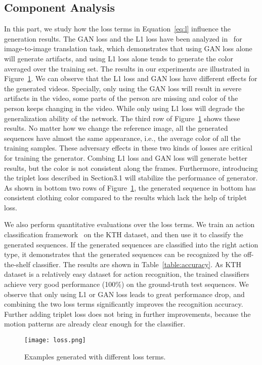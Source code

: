 \documentclass[journal]{IEEEtran}
\begin{document}
\subsection{Component Analysis}
In this part, we study how the loss terms in Equation~\ref{eq:l} influence the generation results. The GAN loss and the L1 loss have been analyzed in~\cite{DBLP:journals/corr/IsolaZZE16} for image-to-image translation task, which demonstrates that using GAN loss alone will generate artifacts, and using L1 loss alone tends to generate the color averaged over the training set. The results in our experiments are illustrated in Figure~\ref{fig:loss}.
We can observe that the L1 loss and GAN loss have different effects for the generated videos. Specially, only using the GAN loss will result in severe artifacts in the video, some parts of the person are missing and color of the person keeps changing in the video. While only using L1 loss will degrade the generalization ability of the network. The third row of Figure~\ref{fig:loss} shows these results. No matter how we change the reference image, all the generated sequences have almost the same appearance, i.e., the average color of all the training samples. These adversary effects in these two kinds of losses are critical for training the generator. Combing L1 loss and GAN loss will generate better results, but the color is not consistent along the frames. Furthermore, introducing the triplet loss described in Section3.1 will stabilize the performance of generator. As shown in bottom two rows of Figure~\ref{fig:loss}, the generated sequence in bottom has consistent clothing color compared to the results which lack the help of triplet loss.

We also perform quantitative evaluations over the loss terms. We train an action classification framework~\cite{DBLP:journals/pami/DonahueHRVGSD17} on the KTH dataset, and then use it to classify the generated sequences. If the generated sequences are classified into the right action type, it demonstrates that the generated sequences can be recognized by the off-the-shelf classifier. The results are shown in Table~\ref{table:accuracy}.
As KTH dataset is a relatively easy dataset for action recognition, the trained classifiers achieve very good performance (100\%) on the ground-truth test sequences. We observe that only using L1 or GAN loss leads to great performance drop, and combining the two loss terms significantly improves the recognition accuracy. Further adding triplet loss does not bring in further improvements, because the motion patterns are already clear enough for the classifier.
\begin{figure}
\texttt{[image: loss.png]}
\caption{Examples generated with different loss terms.}
\label{fig:loss}
\end{figure}
\end{document}
